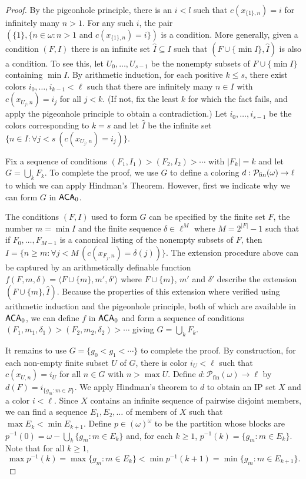 \documentclass{amsart}
\theoremstyle{definition}
\theoremstyle{remark}
\newcommand{\system}[1]{\mbox{\fontfamily{cmss}\fontshape{n}\fontseries{m}%
    \selectfont#1}}
\newcommand{\ACA}{\system{ACA}\ensuremath{_0}}
\newcommand{\fin}{\textup{fin}}
\newcommand{\block}[2]{{#1}^{-1}(#2)}
\begin{document}
\begin{proof}
By the pigeonhole principle, there is an $i < l$ such that
$c(x_{\{1\},n}) = i$ for infinitely many $n > 1$. For any such
$i$, the pair $(\{1\}, \{n \in \omega : n > 1 \text{ and }
c(x_{\{1\},n}) = i\})$ is a condition. More generally, given a
condition $(F,I)$ there is an infinite set $\widehat{I} \subseteq I$
such that $(F \cup \{\min I\}, \widehat{I})$ is also a condition. To
see this, let $U_0,\ldots,U_{s-1}$ be the nonempty subsets of $F
\cup \{\min I\}$ containing $\min I$. By arithmetic induction, for each positive $k \leq s$, there exist colors
$i_0,\ldots,i_{k-1} < \ell$ such that there are infinitely many $n \in
I$ with $c(x_{U_j,n}) = i_j$ for all $j < k$. (If not, fix the least
$k$ for which the fact fails, and apply the pigeonhole principle to
obtain a contradiction.) Let $i_0,\ldots,i_{s-1}$ be the colors
corresponding to $k = s$ and let $\widehat{I}$
be the infinite set $\{n \in I : \forall j < s~(c(x_{U_j,n}) =
i_j)\}$.

Fix a sequence of conditions $(F_1,I_1) > (F_2,I_2) > \cdots$ 
with $|F_k| = k$ and let $G = \bigcup_k F_k$. To complete the proof, we use 
$G$ to define a coloring $d: \mathcal{P}_{\fin}(\omega) \rightarrow \ell$ to which we can 
apply Hindman's Theorem. However, first we indicate why we can form $G$ in $\ACA$. 

The conditions $(F,I)$ used to form $G$ can be specified by the finite set $F$, the number $m = \min I$ and the finite sequence 
$\delta \in \ell^{M}$ where $M = 2^{|F|}-1$ such that if $F_0, \ldots, F_{M-1}$ is a canonical listing of the nonempty subsets of $F$, then 
$I = \{ n \geq m : \forall j < M \,  (c(x_{F_j,n}) = \delta(j)) \}$. The extension procedure above can be captured by an 
arithmetically definable function $f(F,m,\delta) = \langle F \cup \{m \}, m', \delta' \rangle$ where $F \cup \{ m \}$, $m'$ and $\delta'$ describe 
the extension $(F \cup \{ m \}, \widehat{I})$. Because the properties of this extension where verified using arithmetic 
induction and the pigeonhole principle, both of which are available in $\ACA$, we can define $f$ in $\ACA$ and form 
a sequence of conditions $(F_1, m_1, \delta_1) > (F_2, m_2, \delta_2) > \cdots$ giving $G = \bigcup_k F_k$. 

It remains to use $G = \{ g_0 < g_1 < \cdots \}$ to complete the proof. By construction, for each non-empty finite subset $U$ of $G$, there
is color $i_U < \ell$ such that $c(x_{U,n}) = i_U$ for all $n \in G$
with $n > \max U$. Define $d :
\mathcal{P}_{\text{fin}}(\omega) \to \ell$ by $d(F) = i_{\{g_m : m \in
  F\}}$. We apply Hindman's theorem to $d$ to
obtain an IP set $X$ and a color $i < \ell$. Since $X$ contains an
infinite sequence of pairwise disjoint members, we can find a sequence
$E_1,E_2,\ldots$ of members of $X$ such that $\max E_k < \min E_{k+1}$. Define $p \in (\omega)^\omega$ to be the partition whose
blocks are $\block{p}{0} = \omega - \bigcup_k \{g_m : m \in E_k\}$ and, for each $k \geq 1$,
$\block{p}{k} = \{g_m : m \in E_k\}$. Note that for all $k \geq 1$, 
\[
\max \block{p}{k} = \max \{g_m : m \in E_k\} < \min \block{p}{k+1} = \min \{g_m : m \in E_{k+1}\}.
\]
	

\end{proof}
\end{document}
